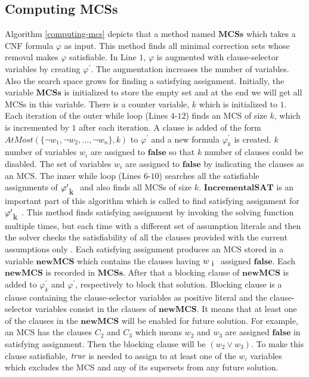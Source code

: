 \subsection{Computing MCSs}
Algorithm \ref{computing-mcs} depicts that a method named $\textbf{MCSs}$ which takes a CNF formula $\varphi$ as input. This method finds all minimal correction sets whose removal makes $\varphi$ satisfiable. In Line $1$, $\varphi$ is augmented with clause-selector variables by creating $\varphi^{\prime}$. The augmentation increases the number of variables. Also the search space grows for finding a satisfying assignment. Initially, the variable $\mathbf{MCSs}$ is initialized to store the empty set and  at the end we will get all MCSs in this variable. There is a counter variable, $k$ which is initialized to $1$.\newline
Each iteration of the outer while loop (Lines $4$-$12$) finds an MCS of size $k$, which is incremented by $1$ after each iteration. A clause is added of the form $AtMost(\{\neg w_{1},\neg w_{2},\ldots,\neg w_{n}\},k)$ to $\varphi^{\prime}$ and a new formula $\varphi^{\prime}_{k}$ is created. $k$ number of variables $w_{i}$ are assigned to $\mathbf{false}$ so that $k$ number of clauses could be disabled. The set of variables $w_{i}$ are assigned to $\mathbf{false}$ by indicating the clauses as an MCS.\newline
The inner while loop (Lines $6$-$10$) searches all the satisfiable assignments of $\varphi^{\prime}_{\text k}$ and also finds all MCSs of size $k$. $\mathbf{IncrementalSAT}$ is an important part of this algorithm which is called to find satisfying assignment for $\varphi^{\prime}_{\text k}$. This method finds satisfying assignment by invoking the solving function multiple times, but each time with a different set of assumption literals and then the solver checks the satisfiability of all the clauses provided with the current assumptions only \cite{nadel}. Each satisfying assignment produces an MCS stored in a variable $\mathbf{newMCS}$ which contains the clauses having $w_{\text i}$ assigned $\mathbf{false}$. Each $\mathbf{newMCS}$ is recorded in $\mathbf{MCSs}$. After that a blocking clause of $\mathbf{newMCS}$ is added to $\varphi^{\prime}_{k}$ and $\varphi^{\prime}$, respectively to block that solution. Blocking clause is a clause containing the clause-selector variables as positive literal and the clause-selector variables consist in the clauses of $\mathbf{newMCS}$. It means that at least one of the clauses in the $\mathbf{newMCS}$ will be enabled for future solution. For example, an MCS has the clauses $C_{2}$ and $C_{3}$ which means $w_{2}$ and $w_{3}$ are assigned $\mathbf{false}$ in satisfying assignment. Then the blocking clause will be $(w_{2}\vee w_{3})$. To make this clause satisfiable, $\emph{true}$ is needed to assign to at least one of the $w_{i}$ variables which excludes the MCS and any of its supersets from any future solution.\newline
